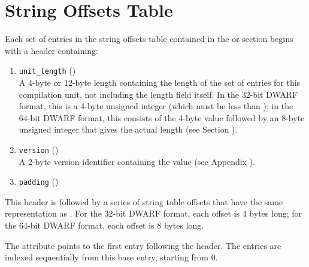 \section{String Offsets Table}
\label{chap:stringoffsetstable}
Each set of entries in the string offsets table contained in the
\dotdebugstroffsets{} or \dotdebugstroffsetsdwo{}
section begins with a header containing:
\begin{enumerate}[1. ]
\item \texttt{unit\_length} () \\
A 4-byte or 12-byte length containing the length of
the set of entries for this compilation unit, not
including the length field itself. In the 32-bit
DWARF format, this is a 4-byte unsigned integer
(which must be less than \xfffffffzero); in the 64-bit
DWARF format, this consists of the 4-byte value
\wffffffff followed by an 8-byte unsigned integer
that gives the actual length (see 
Section ).

\item  \texttt{version} (\HFTuhalf) \\
A 2-byte version identifier containing the value
\versiondotdebugstroffsets{} 
(see Appendix ).

\item \texttt{padding} (\HFTuhalf) \\
\end{enumerate}

This header is followed by a series of string table offsets
that have the same representation as \DWFORMstrp.
For the 32-bit DWARF format, each offset is 4 bytes long; for
the 64-bit DWARF format, each offset is 8 bytes long.

The \DWATstroffsetsbase{} attribute points to the first
entry following the header. The entries are indexed
sequentially from this base entry, starting from 0.


